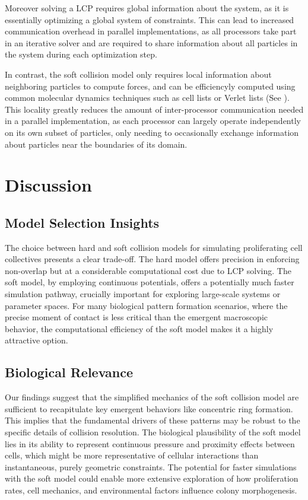 \documentclass[conference]{IEEEtran}
\begin{document}
Moreover solving a LCP requires global information about the system, as it is essentially optimizing a global system of constraints. This can lead to increased communication overhead in parallel implementations, as all processors take part in an iterative solver and are required to share information about all particles in the system during each optimization step.


In contrast, the soft collision model only requires local information about neighboring particles to compute forces, and can be efficiencyly computed using common molecular dynamics techniques such as cell lists or Verlet lists (See \cite{Gratl2019}). This locality greatly reduces the amount of inter-processor communication needed in a parallel implementation, as each processor can largely operate independently on its own subset of particles, only needing to occasionally exchange information about particles near the boundaries of its domain.





\newpage
\section{Discussion}
\subsection{Model Selection Insights}


The choice between hard and soft collision models for simulating proliferating cell collectives presents a clear trade-off. The hard model offers precision in enforcing non-overlap but at a considerable computational cost due to LCP solving. The soft model, by employing continuous potentials, offers a potentially much faster simulation pathway, crucially important for exploring large-scale systems or parameter spaces. For many biological pattern formation scenarios, where the precise moment of contact is less critical than the emergent macroscopic behavior, the computational efficiency of the soft model makes it a highly attractive option.

\subsection{Biological Relevance}

Our findings suggest that the simplified mechanics of the soft collision model are sufficient to recapitulate key emergent behaviors like concentric ring formation. This implies that the fundamental drivers of these patterns may be robust to the specific details of collision resolution. The biological plausibility of the soft model lies in its ability to represent continuous pressure and proximity effects between cells, which might be more representative of cellular interactions than instantaneous, purely geometric constraints. The potential for faster simulations with the soft model could enable more extensive exploration of how proliferation rates, cell mechanics, and environmental factors influence colony morphogenesis.
\end{document}
